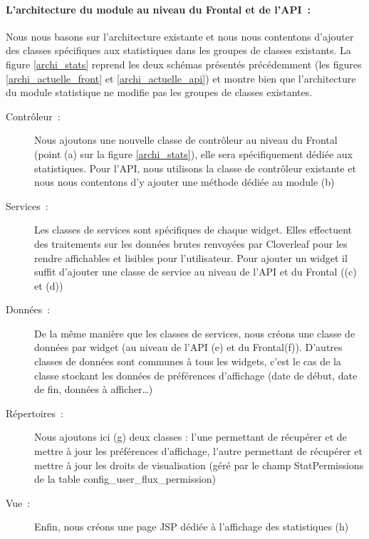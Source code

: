 			\paragraph{L'architecture du module au niveau du Frontal et de l'API~:}
			Nous nous basons sur l'architecture existante et nous nous contentons
			d'ajouter des classes spécifiques aux statistiques dans les groupes de classes
			existants. La figure \ref{archi_stats} reprend les deux schémas présentés
			précédemment (les figures \ref{archi_actuelle_front} et
			\ref{archi_actuelle_api}) et montre bien que l'architecture du module
			statistique ne modifie pas les groupes de classes existantes.
			\begin{description}
				\item[Contrôleur~:] Nous ajoutons une nouvelle classe de contrôleur au
				niveau du Frontal (point (a) sur la figure \ref{archi_stats}), elle sera
				spécifiquement dédiée aux statistiques. Pour l'API, nous utilisons la
				classe de contrôleur existante et nous nous contentons d'y ajouter une
				méthode dédiée au module (b)
				\item[Services~:] Les classes de services sont spécifiques de chaque widget.
				Elles effectuent des traitements sur les données brutes renvoyées par
				Cloverleaf pour les rendre affichables et lisibles pour l'utilisateur. Pour
				ajouter un widget il suffit d'ajouter une classe de service au niveau de
				l'API et du Frontal ((c) et (d))
				\item[Données~:] De la même manière que les classes de services, nous créons
				une classe de données par widget (au niveau de
				l'API (e) et du Frontal(f)). D'autres classes de données sont communes
				à tous les widgets, c'est le cas de la classe stockant les données de
				préférences d'affichage (date de début, date de fin, données à
				afficher\ldots)
				\item[Répertoires~:] Nous ajoutons ici (g) deux classes : l'une permettant
				de récupérer et de mettre à jour les préférences d'affichage, l'autre
				permettant de récupérer et mettre à jour les droits de visualisation (géré
				par le champ StatPermissions de la table config\_user\_flux\_permission)
				\item[Vue~:] Enfin, nous créons une page JSP dédiée à l'affichage des
				statistiques (h)
			\end{description}
